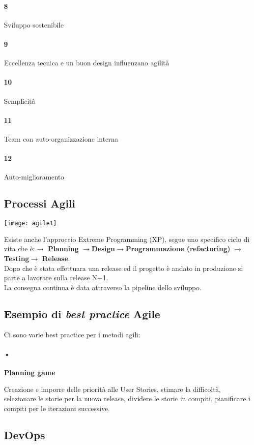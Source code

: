 \paragraph{8}
Sviluppo sostenibile
\paragraph{9}
Eccellenza tecnica e un buon design influenzano agilità
\paragraph{10}
Semplicità
\paragraph{11}
Team con auto-organizzazione interna
\paragraph{12}
Auto-miglioramento

\subsection{Processi Agili}
\begin{center}
\texttt{[image: agile1]}
\end{center}
Esiste anche l'approccio Extreme Programming (XP), segue uno specifico ciclo di vita che è:$\rightarrow$ \textbf{Planning} $\rightarrow$\textbf{Design}$\rightarrow$\textbf{Programmazione (refactoring)} $\rightarrow$ \textbf{Testing}$\rightarrow$ \textbf{Release}. 
\\Dopo che è stata effettuara una release ed il progetto è andato in produzione si parte a lavorare sulla release N+1.
\\ La consegna continua è data attraverso la pipeline dello sviluppo.
\subsection{Esempio di \textit{best practice} Agile}

Ci sono varie best practice per i metodi agili:
\paragraph{•} 
\begin{flushleft}
\textbf{Planning game}
\end{flushleft}
 Creazione e imporre delle priorità alle User Stories, stimare la difficoltà, selezionare le storie per la nuova release, dividere le storie in compiti, pianificare i compiti per le iterazioni successive. 
\subsection{DevOps}